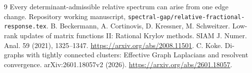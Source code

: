 \documentclass[11pt]{article}
\begin{document}
\begin{thebibliography}{9}
 Every determinant-admissible relative spectrum can arise
from one edge change. Repository working manuscript,
\texttt{spectral-gap/relative-fractional-response.tex}.
 B. Beckermann, A. Cortinovis, D. Kressner, M. Schweitzer.
Low-rank updates of matrix functions II: Rational Krylov methods.
SIAM J. Numer. Anal. 59 (2021), 1325--1347.
\url{https://arxiv.org/abs/2008.11501}.
 C. Koke.
Di-graphs with tightly connected clusters: Effective Graph Laplacians
and resolvent convergence. arXiv:2601.18057v2 (2026).
\url{https://arxiv.org/abs/2601.18057}.
\end{thebibliography}
\end{document}

